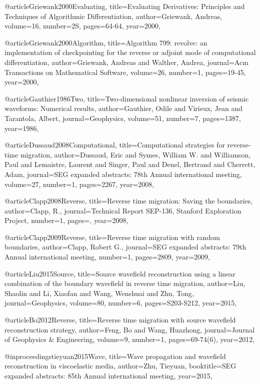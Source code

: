@article{Griewank2000Evaluating,
  title={Evaluating Derivatives: Principles and Techniques of Algorithmic Differentiation},
  author={Griewank, Andreas},
  volume={16},
  number={2S},
  pages={64-64},
  year={2000},
}

@article{Griewank2000Algorithm,
  title={Algorithm 799: revolve: an implementation of checkpointing for the reverse or adjoint mode of computational differentiation},
  author={Griewank, Andreas and Walther, Andrea},
  journal={Acm Transactions on Mathematical Software},
  volume={26},
  number={1},
  pages={19-45},
  year={2000},
}

@article{Gauthier1986Two,
  title={Two‐dimensional nonlinear inversion of seismic waveforms: Numerical results},
  author={Gauthier, Odile and Virieux, Jean and Tarantola, Albert},
  journal={Geophysics},
  volume={51},
  number={7},
  pages={1387},
  year={1986},
}

@article{Dussaud2008Computational,
  title={Computational strategies for reverse-time migration},
  author={Dussaud, Eric and Symes, William W. and Williamson, Paul and Lemaistre, Laurent and Singer, Paul and Denel, Bertrand and Cherrett, Adam},
  journal={SEG expanded abstracts: 78th Annual international meeting},
  volume={27},
  number={1},
  pages={2267},
  year={2008},
}

@article{Clapp2008Reverse,
  title={Reverse time migration: Saving the boundaries},
  author={Clapp, R.},
  journal={Technical Report SEP-136, Stanford Exploration Project},
  number={1},
  pages={},
  year={2008},
}

@article{Clapp2009Reverse,
  title={Reverse time migration with random boundaries},
  author={Clapp, Robert G.},
  journal={SEG expanded abstracts: 79th Annual international meeting},
  number={1},
  pages={2809},
  year={2009},
}

@article{Liu2015Source,
  title={Source wavefield reconstruction using a linear combination of the boundary wavefield in reverse time migration},
  author={Liu, Shaolin and Li, Xiaofan and Wang, Wenshuai and Zhu, Tong},
  journal={Geophysics},
  volume={80},
  number={6},
  pages={S203-S212},
  year={2015},
}

@article{Bo2012Reverse,
  title={Reverse time migration with source wavefield reconstruction strategy},
  author={Feng, Bo and Wang, Huazhong},
  journal={Journal of Geophysics \& Engineering},
  volume={9},
  number={1},
  pages={69-74(6)},
  year={2012},
}

@inproceedings{tieyuan2015Wave,
  title={Wave propagation and wavefield reconstruction in viscoelastic media},
  author={Zhu, Tieyuan},
  booktitle={SEG expanded abstracts: 85th Annual international meeting},
  year={2015},
}


